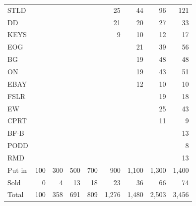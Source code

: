 \documentclass[11pt,a4paper]{article}
\begin{document}
\begin{table}[H]
\begin{tabular}{l r r r r r r r r }
STLD &  &  &  &  & 25 & 44 & 96 & 121 \\
DD &  &  &  &  & 21 & 20 & 27 & 33 \\
KEYS &  &  &  &  & 9 & 10 & 12 & 17 \\
EOG &  &  &  &  &  & 21 & 39 & 56 \\
BG &  &  &  &  &  & 19 & 48 & 48 \\
ON &  &  &  &  &  & 19 & 43 & 51 \\
EBAY &  &  &  &  &  & 12 & 10 & 10 \\
FSLR &  &  &  &  &  &  & 19 & 18 \\
EW &  &  &  &  &  &  & 25 & 43 \\
CPRT &  &  &  &  &  &  & 11 & 9 \\
BF-B &  &  &  &  &  &  &  & 13 \\
PODD &  &  &  &  &  &  &  & 8 \\
RMD &  &  &  &  &  &  &  & 13 \\
\hline
Put in & 100 & 300 & 500 & 700 & 900 & 1,100 & 1,300 & 1,400 \\
Sold & 0 & 4 & 13 & 18 & 23 & 36 & 66 & 74 \\
Total & 100 & 358 & 691 & 809 & 1,276 & 1,480 & 2,503 & 3,456 \\
\hline
\end{tabular}
\end{table}
\end{document}
